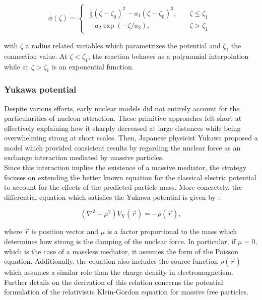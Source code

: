 \documentclass[openany]{book}
\begin{document}
\begin{equation} \label{eq:middleFusion_analytical_proximity_phi}
	\phi (\zeta) = 	\left\{\begin{array}{l}
		\begin{split}
			\frac{1}{2}(\zeta - \zeta_0)^2 - a_1(\zeta - \zeta_0)^3, \quad & \zeta \le \zeta_1 \\ 
			-a_2\exp {(-\zeta/a_3)}, \quad & \zeta > \zeta_1
		\end{split}
	\end{array}\right.
\end{equation}

with $\zeta$ a radius related variables which parametrizes the potential and $\zeta_1$ the connection value. At $\zeta < \zeta_1$, the reaction behaves as a polynomial interpolation while at $\zeta > \zeta_1$ is an exponential function. \\


\subsubsection{Yukawa potential}\label{ssub:potential_effective_Yukawa}


Despite various efforts, early nuclear models did not 
entirely account for the particularities of nucleon attraction. These primitive approaches felt short at effectively explaining how it sharply decreased at large distances while being overwhelming strong at short scales. Then, Japanese physicist Yukawa proposed a model which provided consistent results by regarding the nuclear force as an exchange interaction mediated by massive particles. \\

Since this interaction implies the existence of a massive mediator, the strategy focuses on extending the better known equation for the classical electric potential to account for the effects of the predicted particle mass. More concretely, the differential equation which satisfies the Yukawa potential is given by \cite{basdevant_rich_spiro_2004}: 

\begin{equation} \label{eq:potential_Yukawa_PoissonEquation}
	(\nabla^2 - \mu^2)V_\mathrm{Y}(\vec r) = -\rho(\vec r),
\end{equation}

where $\vec r$ is position vector and $\mu$ is a factor proportional to the mass which determines how strong is the damping of the nuclear force. In particular, if $\mu=0$, which is the case of a massless mediator, it assumes the form of the Poisson equation. Additionally, the equation also includes the source function $\rho(\vec r)$ which assumes a similar role than the charge density in electromagnetism. Further details on the derivation of this relation concerns the potential formulation of the relativistic Klein-Gordon equation for massive free particles. \\
\end{document}
